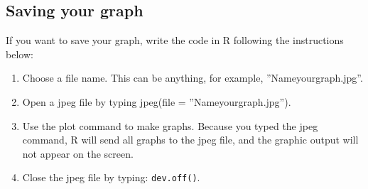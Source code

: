 \documentclass[12pt,a4paper]{article}\usepackage[]{graphicx}\usepackage[]{color}
\begin{document}
\subsection{Saving your graph}
If you want to save your graph, write the code in R following the instructions below:
\begin{enumerate}
\item Choose a file name. This can be anything, for example, ''Nameyourgraph.jpg''.
\item Open a jpeg file by typing jpeg(file = ''Nameyourgraph.jpg'').
\item Use the plot command to make graphs. Because you typed the jpeg command, R will send all graphs to the jpeg file, and the graphic output will not appear on the screen.
\item Close the jpeg file by typing: \texttt{dev.off()}.
\end{enumerate}
\end{document}
